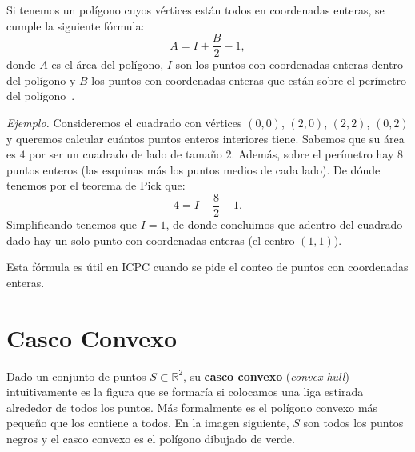 Si tenemos un polígono cuyos vértices están todos en coordenadas enteras, se cumple la siguiente fórmula:
\[
A=I+\frac{B}{2}-1,
\]
donde $A$ es el área del polígono, $I$ son los puntos con coordenadas enteras dentro del polígono y $B$ los puntos con coordenadas enteras que están sobre el perímetro del polígono~\cite{pick}.

\textit{Ejemplo.} Consideremos el cuadrado con vértices $(0,0)$, $(2,0)$, $(2,2)$, $(0,2)$ y queremos calcular cuántos puntos enteros interiores tiene. Sabemos que su área es $4$ por ser un cuadrado de lado de tamaño $2$. Además, sobre el perímetro hay $8$ puntos enteros (las esquinas más los puntos medios de cada lado). De dónde tenemos por el teorema de Pick que:
\[4=I+\frac{8}{2}-1.\]
Simplificando tenemos que $I=1$, de donde concluimos que adentro del cuadrado dado hay un solo punto con coordenadas enteras (el centro $(1,1)$).

Esta fórmula es útil en ICPC cuando se pide el conteo de puntos con coordenadas enteras.
\section{Casco Convexo}
Dado un conjunto de puntos $S \subset \mathbb{R}^2$, su \textbf{casco convexo} (\textit{convex hull}) intuitivamente es la figura que se formaría si colocamos una liga estirada alrededor de todos los puntos. Más formalmente es el polígono convexo más pequeño que los contiene a todos. En la imagen siguiente, $S$ son todos los puntos negros y el casco convexo es el polígono dibujado de verde.

\begin{figure}[H]
  \centering
 \end{figure}
 
